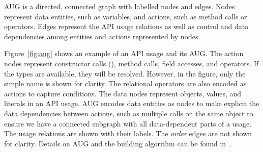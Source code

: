 \begin{Definition}
AUG is a directed, connected graph with labelled nodes and
edges. Nodes represent data entities, such as variables, and actions,
such as method calls or operators. Edges represent the API usage
relations as well as control and data dependencies among entities and
actions represented by nodes.
\end{Definition}



Figure~\ref{fig:aug} shows an example of an API usage and its AUG.
The action nodes represent constructor calls (), method
calls, field accesses, and operators. If the types are available, they
will be resolved. However, in the figure, only the simple name is
shown for clarity. The relational operators are also encoded as
actions to capture conditions. The data nodes represent objects,
values, and literals in an API usage. AUG encodes data entities as
nodes to make explicit the data dependencies between actions, such as
multiple calls on the same object to ensure we have a connected
subgraph with all data-dependent parts of a usage. The usage relations
are shown with their labels. The {\em order} edges are not shown for
clarity. Details on AUG and the building algorithm can be found
in~\cite{msr19}.
